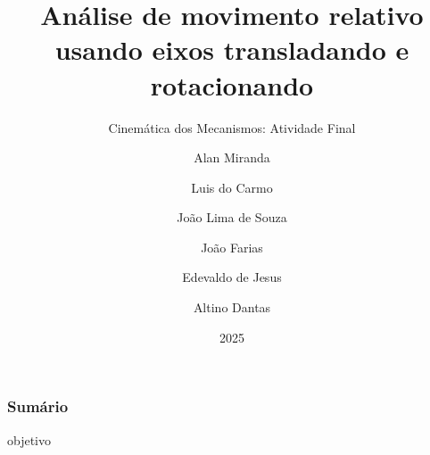 

\title[UFPA]{Análise de movimento relativo usando eixos transladando e rotacionando}
\subtitle{Cinemática dos Mecanismos: Atividade Final}
\author{
    Alan Miranda \and
    Luis do Carmo \and
    João Lima de Souza \and
    João Farias \and
    Edevaldo de Jesus \and
    Altino Dantas\and
}

\date{2025}
\frame[noframenumbering]{\titlepage}



\begin{frame}
    \frametitle{Sumário}
    \tableofcontents
\end{frame}
objetivo